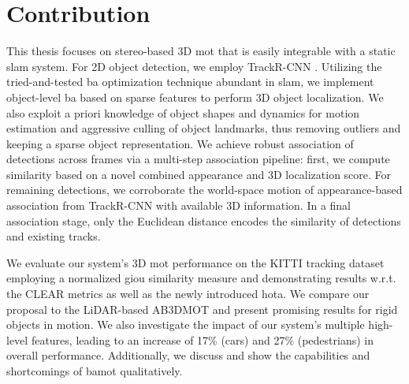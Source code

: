 \documentclass[headsepline, hidelinks, footsepline, footinclude=false, oneside, fontsize=11pt, paper=a4, listof=totoc, bibliography=totoc]{scrbook}
\begin{document}
\section{Contribution}
\label{sec:org825632b}
This thesis focuses on stereo-based 3D \gls{mot} that is easily integrable with a static \gls{slam} system.
For 2D object detection, we employ TrackR-CNN \cite{voigtlaenderMOTSMultiObjectTracking2019}. 
Utilizing the tried-and-tested \gls{ba} optimization technique abundant in \gls{slam}, we implement object-level \gls{ba} based on sparse features to perform 3D object localization. 
We also exploit a priori knowledge of object shapes and dynamics for motion estimation and aggressive culling of object landmarks, thus removing outliers and keeping a sparse object representation.
We achieve robust association of detections across frames via a multi-step association pipeline: first, we compute similarity based on a novel combined appearance and 3D localization score.
For remaining detections, we corroborate the world-space motion of appearance-based association from TrackR-CNN with available 3D information. 
In a final association stage, only the Euclidean distance encodes the similarity of detections and existing tracks.

We evaluate our system's 3D \gls{mot} performance on the KITTI \cite{geigerVisionMeetsRobotics2013} tracking dataset employing a normalized \gls{giou} similarity measure and 
demonstrating results w.r.t. the CLEAR metrics as well as the newly introduced \gls{hota}.
We compare our proposal to the LiDAR-based AB3DMOT \cite{wengBaseline3DMultiObject2019} and present promising results for rigid objects in motion. 
We also investigate the impact of our system's multiple high-level features, leading to an increase of 17\% (cars) and 27\% (pedestrians) in overall performance.
Additionally, we discuss and show the capabilities and shortcomings of \gls{bamot} qualitatively.


\newpage
\end{document}
